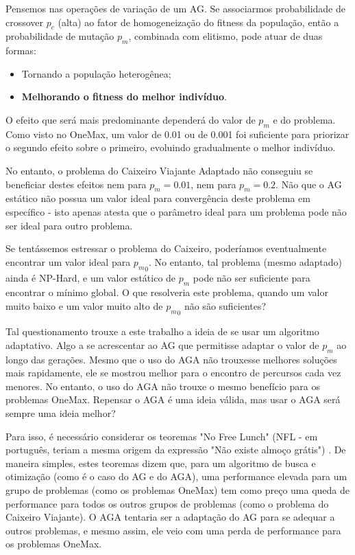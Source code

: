 Pensemos nas operações de variação de um AG. Se associarmos probabilidade de crossover $p_c$ (alta) ao fator de homogeneização do fitness da população, então a probabilidade de mutação $p_m$, combinada com elitismo, pode atuar de duas formas:

\begin{itemize}
	\item Tornando a população heterogênea;
	\item \textbf{Melhorando o fitness do melhor indivíduo}.
\end{itemize}

O efeito que será mais predominante dependerá do valor de $p_m$ e do problema. Como visto no OneMax, um valor de 0.01 ou de 0.001 foi suficiente para priorizar o segundo efeito sobre o primeiro, evoluindo gradualmente o melhor indivíduo.

No entanto, o problema do Caixeiro Viajante Adaptado não conseguiu se beneficiar destes efeitos nem para $p_m=0.01$, nem para $p_m=0.2$. Não que o AG estático não possua um valor ideal para convergência deste problema em específico - isto apenas atesta que o parâmetro ideal para um problema pode não ser ideal para outro problema.

Se tentássemos estressar o problema do Caixeiro, poderíamos eventualmente encontrar um valor ideal para ${p_m}_0$. No entanto, tal problema (mesmo adaptado) ainda é NP-Hard, e um valor estático de $p_m$ pode não ser suficiente para encontrar o mínimo global. O que resolveria este problema, quando um valor muito baixo e um valor muito alto de ${p_m}_0$ não são suficientes?

Tal questionamento trouxe a este trabalho a ideia de se usar um algoritmo adaptativo. Algo a se acrescentar ao AG que permitisse adaptar o valor de $p_m$ ao longo das gerações. Mesmo que o uso do AGA não trouxesse melhores soluções mais rapidamente, ele se mostrou melhor para o encontro de percursos cada vez menores. No entanto, o uso do AGA não trouxe o mesmo benefício para os problemas OneMax. Repensar o AGA é uma ideia válida, mas usar o AGA será sempre uma ideia melhor?

Para isso, é necessário considerar os teoremas "No Free Lunch" (NFL - em português, teriam a mesma origem da expressão "Não existe almoço grátis") \cite{wolpert1997no}. De maneira simples, estes teoremas dizem que, para um algoritmo de busca e otimização (como é o caso do AG e do AGA), uma performance elevada para um grupo de problemas (como os problemas OneMax) tem como preço uma queda de performance para todos os outros grupos de problemas (como o problema do Caixeiro Viajante). O AGA tentaria ser a adaptação do AG para se adequar a outros problemas, e mesmo assim, ele veio com uma perda de performance para os problemas OneMax.

